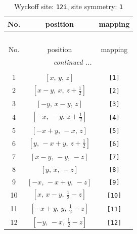 \documentclass[fleqn,8pt]{jsarticle}
\begin{document}
\renewcommand{\arraystretch}{1.2}
\begin{longtable}{ccc}
\caption{Wyckoff site: {\tt 12i}, site symmetry: {\tt 1}}
 \\
 \hline \hline
No. & position & mapping \\ \hline \endfirsthead

\multicolumn{2}{l}{\tablename\ \thetable{}} \\
 \hline \hline
No. & position & mapping \\ \hline \endhead

 \hline \hline
\multicolumn{2}{r}{\footnotesize\it continued ...} \\ \endfoot

 \hline \hline
\multicolumn{2}{r}{} \\ \endlastfoot

1 & $\left[ x,\, y,\, z \right]$ & {\tt [1]} \\ \hline
2 & $\left[ x - y,\, x,\, z + \frac{1}{2} \right]$ & {\tt [2]} \\ \hline
3 & $\left[ - y,\, x - y,\, z \right]$ & {\tt [3]} \\ \hline
4 & $\left[ - x,\, - y,\, z + \frac{1}{2} \right]$ & {\tt [4]} \\ \hline
5 & $\left[ - x + y,\, - x,\, z \right]$ & {\tt [5]} \\ \hline
6 & $\left[ y,\, - x + y,\, z + \frac{1}{2} \right]$ & {\tt [6]} \\ \hline
7 & $\left[ x - y,\, - y,\, - z \right]$ & {\tt [7]} \\ \hline
8 & $\left[ y,\, x,\, - z \right]$ & {\tt [8]} \\ \hline
9 & $\left[ - x,\, - x + y,\, - z \right]$ & {\tt [9]} \\ \hline
10 & $\left[ x,\, x - y,\, \frac{1}{2} - z \right]$ & {\tt [10]} \\ \hline
11 & $\left[ - x + y,\, y,\, \frac{1}{2} - z \right]$ & {\tt [11]} \\ \hline
12 & $\left[ - y,\, - x,\, \frac{1}{2} - z \right]$ & {\tt [12]} \\
\end{longtable}
\end{document}
